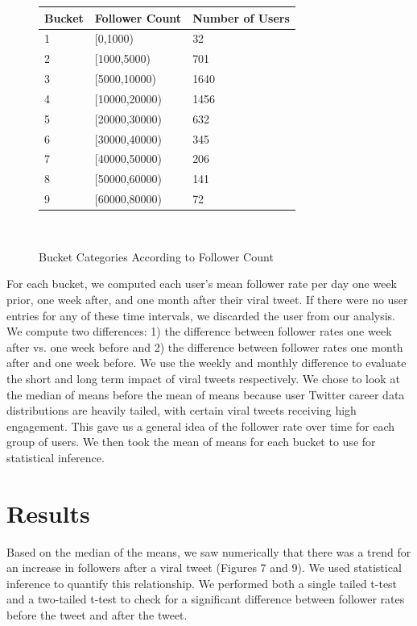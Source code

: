 \documentclass[twoside,twocolumn]{article}
\begin{document}
\begin{figure}[H]
\begin{tabular}{ | m{1cm} | m{3cm} |m{1.5cm} | } 
  \hline
    Bucket & Follower Count & Number of Users \\ 
  \hline
  1 & [0,1000) & 32\\ 
  \hline
  2 & [1000,5000) & 701 \\ 
  \hline
  3 & [5000,10000) & 1640\\ 
  \hline
  4 & [10000,20000) & 1456 \\ 
  \hline
  5 & [20000,30000) & 632 \\ 
  \hline
  6 & [30000,40000)&345 \\ 
  \hline
  7 & [40000,50000) & 206\\ 
  \hline
  8 & [50000,60000) & 141 \\ 
  \hline
  9 & [60000,80000)& 72 \\ 
  \hline
\end{tabular}\\
\caption{Bucket Categories According to Follower Count}
\end{figure}
For each bucket, we computed each user’s mean follower rate per day one week prior, one week after, and one month after their viral tweet. If there were no user entries for any of these time intervals, we discarded the user from our analysis. We compute two differences: 1) the difference between follower rates one week after vs. one week before and 2) the difference between follower rates one month after and one week before. We use the weekly and monthly difference to evaluate the short and long term impact of viral tweets respectively. We chose to look at the median of means before the mean of means because user Twitter career data distributions are heavily tailed, with certain viral tweets receiving high engagement. This gave us a general idea of the follower rate over time for each group of users. We then took the mean of means for each bucket to use for statistical inference.


\section{Results}
Based on the median of the means, we saw numerically that there was a trend for an increase in followers after a viral tweet (Figures 7 and 9). We used statistical inference to quantify this relationship. We performed both a single tailed t-test and a two-tailed t-test to check for a significant difference between follower rates before the tweet and after the tweet.\\
\end{document}
